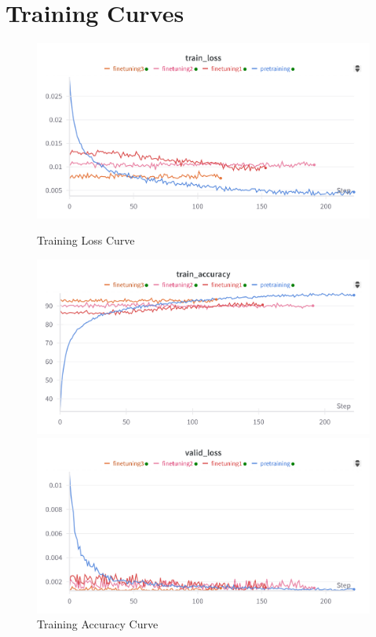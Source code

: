 \documentclass[a4 paper,12pt]{article}
\theoremstyle{definitionstyle}
\begin{document}
\section*{Training Curves}
\begin{figure}[H]
    \centering
    \begin{minipage}{0.48\textwidth}
        \centering
        \includegraphics[width=\textwidth]{train_loss.png}
        \caption{Training Loss Curve}
        \label{fig:train_loss}
    \end{minipage}
    \hfill
    \begin{minipage}{0.48\textwidth}
        \centering
        \includegraphics[width=\textwidth]{train_accuracy.png}
        \caption{Training Accuracy Curve}
        \label{fig:train_accuracy}
    \end{minipage}
    \vfill
    \begin{minipage}{0.48\textwidth}
        \centering
        \includegraphics[width=\textwidth]{valid_loss.png}

\end{minipage}
\end{figure}
\end{document}
